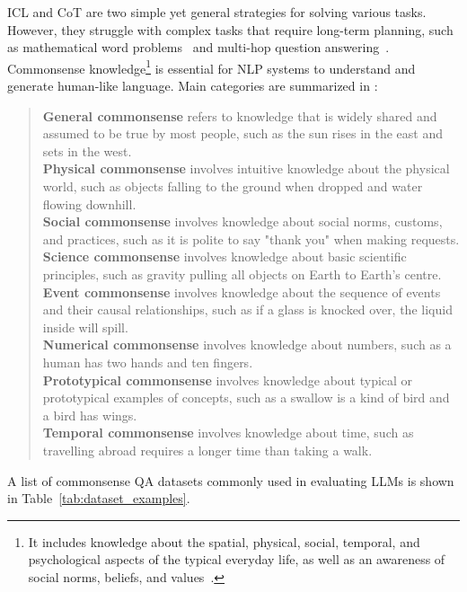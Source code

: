 ICL and CoT are two simple yet general strategies for solving various tasks.
However, they struggle with complex tasks that require long-term planning, such as mathematical word problems~\cite{qian2022limitations} and multi-hop question answering~\cite{bian2024chatgpt}.
Commonsense knowledge\footnote{It includes knowledge about the spatial, physical, social, temporal, and psychological aspects of the typical everyday life, as well as an awareness of social norms, beliefs, and values~\cite{liu2004conceptnet}.} is essential for NLP systems to understand and generate human-like language.
Main categories are summarized in \textcite{bian2024chatgpt}:
\begin{quote}
	\textbf{General commonsense} refers to knowledge that is widely shared and assumed to be true by most people, such as the sun rises in the east and sets in the west.\\
	\textbf{Physical commonsense} involves intuitive knowledge about the physical world, such as objects falling to the ground when dropped and water flowing downhill.\\
	\textbf{Social commonsense} involves knowledge about social norms, customs, and practices, such as it is polite to say "thank you" when
	making requests.\\
	\textbf{Science commonsense} involves knowledge about basic scientific principles, such as gravity pulling all objects on Earth to Earth’s centre.\\
	\textbf{Event commonsense} involves knowledge about the sequence of events and their causal relationships, such as if a glass is knocked over, the liquid inside will spill.\\
	\textbf{Numerical commonsense} involves knowledge about numbers, such as a human has two hands and ten fingers.\\
	\textbf{Prototypical commonsense} involves knowledge about typical or prototypical examples of concepts, such as a swallow is a kind of bird and a bird has wings.\\
	\textbf{Temporal commonsense} involves knowledge about time, such as travelling abroad requires a longer time than taking a walk.
\end{quote}
A list of commonsense QA datasets commonly used in evaluating LLMs is shown in Table~\ref{tab:dataset_examples}.
